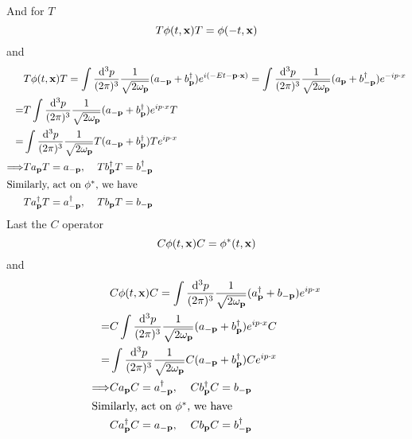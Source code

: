 \documentclass{article}
\begin{document}
And for $T$
$$T\phi(t,\vb{x})T=\phi(-t,\vb{x})$$
and
\begin{align*}
  &T\phi(t,\vb{x})T=\int\frac{\dd^3p}{(2\pi)^3}\frac{1}{\sqrt{2\omega_{\vb{p}}}}(a_{-\vb{p}}+b_{\vb{p}}^{\dagger})e^{i(-Et-\vb{p}\cdot\vb{x})}=\int\frac{\dd^3p}{(2\pi)^3}\frac{1}{\sqrt{2\omega_{\vb{p}}}}(a_{\vb{p}}+b_{-\vb{p}}^{\dagger})e^{-ip\cdot x}\\
  =&T\int\frac{\dd^3p}{(2\pi)^3}\frac{1}{\sqrt{2\omega_{\vb{p}}}}(a_{-\vb{p}}+b_{\vb{p}}^{\dagger})e^{ip\cdot x}T\\
  =&\int\frac{\dd^3p}{(2\pi)^3}\frac{1}{\sqrt{2\omega_{\vb{p}}}}T(a_{-\vb{p}}+b_{\vb{p}}^{\dagger})Te^{ip\cdot x}\\
  \Longrightarrow&Ta_{\vb{p}}T=a_{-\vb{p}},\;\;\;\;Tb_{\vb{p}}^{\dagger}T=b_{-\vb{p}}^{\dagger}\\
  \intertext{Similarly, act on $\phi^*$, we have}&Ta_{\vb{p}}^{\dagger}T=a_{-\vb{p}}^{\dagger},\;\;\;\;Tb_{\vb{p}}T=b_{-\vb{p}}
\end{align*}
Last the $C$ operator
$$C\phi(t,\vb{x})C=\phi^*(t,\vb{x})$$
and
\begin{align*}
  &C\phi(t,\vb{x})C=\int\frac{\dd^3p}{(2\pi)^3}\frac{1}{\sqrt{2\omega_{\vb{p}}}}(a_{\vb{p}}^{\dagger}+b_{-\vb{p}})e^{ip\cdot x}%
  \\=&C\int\frac{\dd^3p}{(2\pi)^3}\frac{1}{\sqrt{2\omega_{\vb{p}}}}(a_{-\vb{p}}+b_{\vb{p}}^{\dagger})e^{ip\cdot x}C\\
  =&\int\frac{\dd^3p}{(2\pi)^3}\frac{1}{\sqrt{2\omega_{\vb{p}}}}C(a_{-\vb{p}}+b_{\vb{p}}^{\dagger})Ce^{ip\cdot x}\\
  \Longrightarrow&Ca_{\vb{p}}C=a_{-\vb{p}}^{\dagger},\;\;\;\;Cb_{\vb{p}}^{\dagger}C=b_{-\vb{p}}\\
  \intertext{Similarly, act on $\phi^*$, we have}&Ca_{\vb{p}}^{\dagger}C=a_{-\vb{p}},\;\;\;\;Cb_{\vb{p}}C=b_{-\vb{p}}^{\dagger}
\end{align*}
\end{document}
